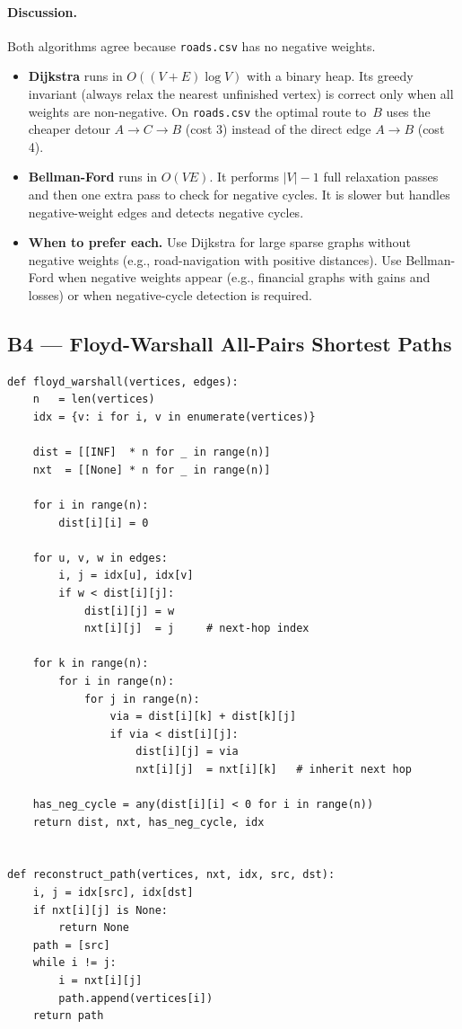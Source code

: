 \documentclass[11pt,a4paper]{article}
\begin{document}
\paragraph{Discussion.}
Both algorithms agree because \texttt{roads.csv} has no negative weights.

\begin{itemize}[noitemsep]
  \item \textbf{Dijkstra} runs in $O((V+E)\log V)$ with a binary heap. Its greedy invariant (always relax the nearest unfinished vertex) is correct only when all weights are non-negative. On \texttt{roads.csv} the optimal route to~$B$ uses the cheaper detour $A\to C\to B$ (cost 3) instead of the direct edge $A\to B$ (cost 4).
  \item \textbf{Bellman-Ford} runs in $O(VE)$. It performs $|V|-1$ full relaxation passes and then one extra pass to check for negative cycles. It is slower but handles negative-weight edges and detects negative cycles.
  \item \textbf{When to prefer each.} Use Dijkstra for large sparse graphs without negative weights (e.g., road-navigation with positive distances). Use Bellman-Ford when negative weights appear (e.g., financial graphs with gains and losses) or when negative-cycle detection is required.
\end{itemize}

\subsection{B4 --- Floyd-Warshall All-Pairs Shortest Paths}

\begin{lstlisting}[style=python, caption={Floyd-Warshall with path reconstruction (src/b4\_floyd\_warshall.py).}]
def floyd_warshall(vertices, edges):
    n   = len(vertices)
    idx = {v: i for i, v in enumerate(vertices)}

    dist = [[INF]  * n for _ in range(n)]
    nxt  = [[None] * n for _ in range(n)]

    for i in range(n):
        dist[i][i] = 0

    for u, v, w in edges:
        i, j = idx[u], idx[v]
        if w < dist[i][j]:
            dist[i][j] = w
            nxt[i][j]  = j     # next-hop index

    for k in range(n):
        for i in range(n):
            for j in range(n):
                via = dist[i][k] + dist[k][j]
                if via < dist[i][j]:
                    dist[i][j] = via
                    nxt[i][j]  = nxt[i][k]   # inherit next hop

    has_neg_cycle = any(dist[i][i] < 0 for i in range(n))
    return dist, nxt, has_neg_cycle, idx


def reconstruct_path(vertices, nxt, idx, src, dst):
    i, j = idx[src], idx[dst]
    if nxt[i][j] is None:
        return None
    path = [src]
    while i != j:
        i = nxt[i][j]
        path.append(vertices[i])
    return path
\end{lstlisting}
\end{document}
